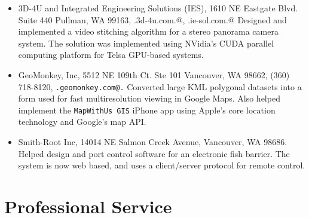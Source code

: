 \documentclass[10pt]{article}
\begin{document}
\begin{itemize}

\item 3D-4U and Integrated Engineering Solutions (IES), 
1610 NE Eastgate Blvd.
Suite 440
Pullman, WA 99163,
\verb@www.3d-4u.com.@, \verb@www.ie-sol.com.@
Designed and implemented a video stitching algorithm for
a stereo panorama camera system. The solution was
implemented using NVidia's CUDA parallel computing platform
for Telsa GPU-based systems.


\item GeoMonkey, Inc, 
5512 NE 109th Ct. Ste 101
Vancouver, WA 98662,
(360) 718-8120,
{\tt \verb@www.geomonkey.com@.}  
  Converted large KML polygonal datasets into a form used for
  fast multiresolution viewing in Google Maps.
  Also helped implement the {\tt MapWithUs GIS} iPhone app using Apple's core location technology
  and Google's map API.
\item Smith-Root Inc, 14014 NE Salmon Creek Avenue, Vancouver, WA 98686.\\
Helped design and port control software for an
electronic fish barrier. The system is now web based, and uses a 
client/server protocol for remote control.
\end{itemize}



\section*{Professional Service}
\end{document}
